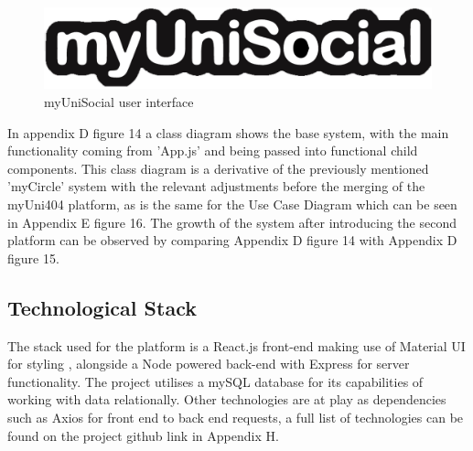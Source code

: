\documentclass[lettersize,journal]{IEEEtran}
\begin{document}
	 \begin{figure}[h!]
                \includegraphics[width=\linewidth]{images/myunisocial.PNG}
                \caption{myUniSocial user interface}
                \label{figure 2}
        \end{figure}


        In appendix D figure 14 a class diagram shows the base system, with the main functionality coming from 'App.js' and being passed into
        functional child components. This class diagram is a derivative of the previously mentioned 'myCircle' system with the relevant adjustments before the merging of the myUni404 platform,
        as is the same for the Use Case Diagram which can be seen in Appendix E figure 16. The growth of the system after introducing the second platform can be observed by comparing Appendix D figure 14
	 with Appendix D figure 15.

        \subsection{Technological Stack}
        The stack used for the platform is a React.js front-end \cite{React} making use of Material UI for styling \cite{Mui}, alongside a Node powered back-end \cite{Node} with Express for server
    functionality\cite{Express}. The project utilises a mySQL database for its capabilities of working with data relationally. Other technologies are at play as dependencies such as Axios for front end to
     back end requests, a full list of technologies can be found on the project github link in Appendix H.
\end{document}
